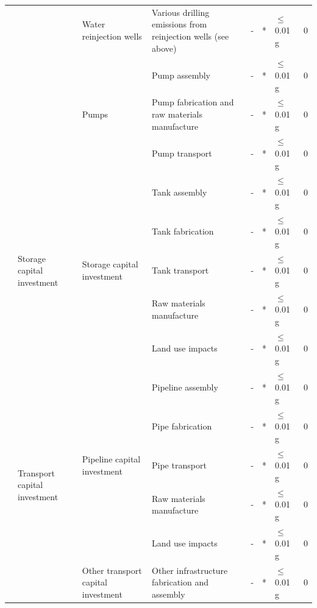 \documentclass[11pt]{report}
\begin{document}
\begin{landscape}
\begin{table}
\begin{scriptsize}
\begin{tabular}{|p{}|p{}|p{}|p{}|r|p{}|p{}|p{}|}
\cline{3-8}
& & Water reinjection wells & Various drilling emissions from reinjection wells (see above) & - & * & $\leq$ 0.01 g & 0\\
\cline{3-8}
& & \multirow{3}{*}{Pumps} & Pump assembly & - & * & $\leq$ 0.01 g & 0\\
\cline{4-8}
& & & Pump fabrication and raw materials manufacture & - & * & $\leq$ 0.01 g & 0\\
\cline{4-8}
& & & Pump transport & - & * & $\leq$ 0.01 g & 0\\
\cline{2-8}
& \multirow{5}{0.09\columnwidth}{Storage capital investment} & \multirow{5}{0.12\columnwidth}{Storage capital investment} & Tank assembly & - & * & $\leq$ 0.01 g & 0\\
\cline{4-8}
& & & Tank fabrication & - & * & $\leq$ 0.01 g & 0\\
\cline{4-8}
& & & Tank transport & - & * & $\leq$ 0.01 g & 0\\
\cline{4-8}
& & & Raw materials manufacture & - & * & $\leq$ 0.01 g & 0\\
\cline{4-8}
& & & Land use impacts & - & * & $\leq$ 0.01 g & 0\\
\cline{2-8}
& \multirow{6}{0.09\columnwidth}{Transport capital investment} & \multirow{5}{0.12\columnwidth}{Pipeline capital investment} & Pipeline assembly & - & * & $\leq$ 0.01 g & 0\\
\cline{4-8}
& & & Pipe fabrication & - & * & $\leq$ 0.01 g & 0\\
\cline{4-8}
& & & Pipe transport & - & * & $\leq$ 0.01 g & 0\\
\cline{4-8}
& & & Raw materials manufacture & - & * & $\leq$ 0.01 g & 0\\
\cline{4-8}
& & & Land use impacts & - & * & $\leq$ 0.01 g & 0\\
\cline{3-8}
& & Other transport capital investment & Other infrastructure fabrication and assembly & - & * & $\leq$ 0.01 g & 0\\
\hline
\end{tabular}
\end{scriptsize}
\end{table}


\end{landscape}
\end{document}
